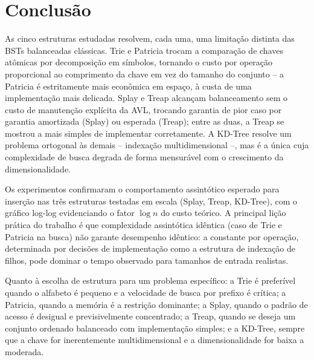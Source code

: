 \documentclass[conference]{IEEEtran}
\begin{document}
\section{Conclusão}

As cinco estruturas estudadas resolvem, cada uma, uma limitação distinta das BSTs balanceadas clássicas. Trie e Patricia trocam a comparação de chaves atômicas por decomposição em símbolos, tornando o custo por operação proporcional ao comprimento da chave em vez do tamanho do conjunto -- a Patricia é estritamente mais econômica em espaço, à custa de uma implementação mais delicada. Splay e Treap alcançam balanceamento sem o custo de manutenção explícita da AVL, trocando garantia de pior caso por garantia amortizada (Splay) ou esperada (Treap); entre as duas, a Treap se mostrou a mais simples de implementar corretamente. A KD-Tree resolve um problema ortogonal às demais -- indexação multidimensional --, mas é a única cuja complexidade de busca degrada de forma mensurável com o crescimento da dimensionalidade.

Os experimentos confirmaram o comportamento assintótico esperado para inserção nas três estruturas testadas em escala (Splay, Treap, KD-Tree), com o gráfico log-log evidenciando o fator $\log n$ do custo teórico. A principal lição prática do trabalho é que complexidade assintótica idêntica (caso de Trie e Patricia na busca) não garante desempenho idêntico: a constante por operação, determinada por decisões de implementação como a estrutura de indexação de filhos, pode dominar o tempo observado para tamanhos de entrada realistas.

Quanto à escolha de estrutura para um problema específico: a Trie é preferível quando o alfabeto é pequeno e a velocidade de busca por prefixo é crítica; a Patricia, quando a memória é a restrição dominante; a Splay, quando o padrão de acesso é desigual e previsivelmente concentrado; a Treap, quando se deseja um conjunto ordenado balanceado com implementação simples; e a KD-Tree, sempre que a chave for inerentemente multidimensional e a dimensionalidade for baixa a moderada.
\end{document}
